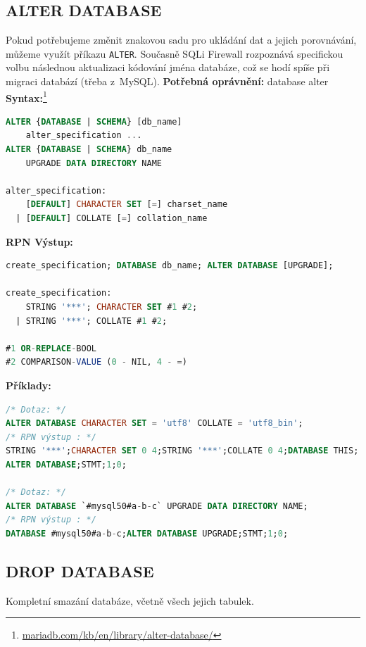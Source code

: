 \subsection{ALTER DATABASE} \label{subsec:6:alterdb}
Pokud potřebujeme změnit znakovou sadu pro ukládání dat a jejich porovnávání, můžeme využít příkazu \texttt{ALTER}.
Současně SQLi Firewall rozpoznává specifickou volbu následnou aktualizaci kódování jména databáze, což se hodí spíše při migraci databází (třeba z~MySQL).
\newpage
\textbf{Potřebná oprávnění:} database alter \\

\textbf{Syntax:}\footnote{\url{mariadb.com/kb/en/library/alter-database/}}
\begin{lstlisting}[language=sql]
ALTER {DATABASE | SCHEMA} [db_name]
    alter_specification ...
ALTER {DATABASE | SCHEMA} db_name
    UPGRADE DATA DIRECTORY NAME

alter_specification:
    [DEFAULT] CHARACTER SET [=] charset_name
  | [DEFAULT] COLLATE [=] collation_name
\end{lstlisting}
\vspace*{\baselineskip}
\textbf{RPN Výstup:}
\begin{lstlisting}[language=sql]
create_specification; DATABASE db_name; ALTER DATABASE [UPGRADE];

create_specification:
    STRING '***'; CHARACTER SET #1 #2;
  | STRING '***'; COLLATE #1 #2;

#1 OR-REPLACE-BOOL
#2 COMPARISON-VALUE (0 - NIL, 4 - =)
\end{lstlisting}
\vspace*{\baselineskip}
\textbf{Příklady:}
\begin{lstlisting}[language=sql]
/* Dotaz: */
ALTER DATABASE CHARACTER SET = 'utf8' COLLATE = 'utf8_bin';
/* RPN výstup : */
STRING '***';CHARACTER SET 0 4;STRING '***';COLLATE 0 4;DATABASE THIS;
ALTER DATABASE;STMT;1;0;

/* Dotaz: */
ALTER DATABASE `#mysql50#a-b-c` UPGRADE DATA DIRECTORY NAME;
/* RPN výstup : */
DATABASE #mysql50#a-b-c;ALTER DATABASE UPGRADE;STMT;1;0;
\end{lstlisting}

\subsection{DROP DATABASE} \label{subsec:6:dropdb}
Kompletní smazání databáze, včetně všech jejich tabulek. \\

